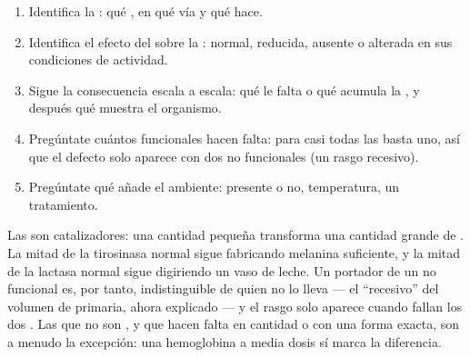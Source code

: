 \begin{method}\label{met:g11:enzymes-and-phenotype:reason}
\begin{enumerate}
  \item Identifica la : qué , en qué vía y qué hace.
  \item Identifica el efecto del  sobre la : normal,
        reducida, ausente o alterada en sus condiciones de actividad.
  \item Sigue la consecuencia escala a escala: qué le falta o qué
        acumula la , y después qué muestra el organismo.
  \item Pregúntate cuántos  funcionales hacen falta: para casi
        todas las  basta uno, así que el defecto solo aparece
        con dos  no funcionales (un rasgo recesivo).
  \item Pregúntate qué añade el ambiente:  presente o no,
        temperatura, un tratamiento.
\end{enumerate}
\end{method}

\begin{remark}\label{rem:g11:enzymes-and-phenotype:recessive}
Las  son catalizadores: una cantidad pequeña transforma una
cantidad grande de . La mitad de la tirosinasa normal sigue
fabricando melanina suficiente, y la mitad de la lactasa normal sigue
digiriendo un vaso de leche. Un portador de un  no funcional es,
por tanto, indistinguible de quien no lo lleva --- el ``recesivo'' del
volumen de primaria, ahora explicado --- y el rasgo solo aparece cuando
fallan los dos . Las  que no son , y que hacen
falta en cantidad o con una forma exacta, son a menudo la excepción:
una hemoglobina a media dosis sí marca la diferencia.
\end{remark}


